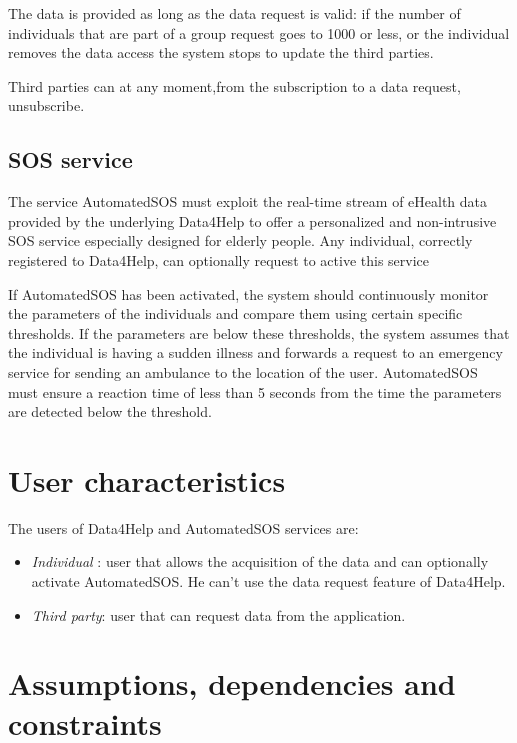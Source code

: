 The data is provided as long as the data request is valid: if the number of individuals that are part of a group request goes to 1000 or less, or the individual removes the data access the system stops to update the third parties. 

Third parties can at any moment,from the subscription to a data request, unsubscribe.





\subsection{SOS service}
The service AutomatedSOS must exploit the real-time stream of eHealth data provided by the underlying Data4Help to offer a personalized and non-intrusive SOS service especially designed for elderly people.
Any individual, correctly registered to Data4Help, can optionally request to active this service


If AutomatedSOS has been activated, the system should continuously monitor the parameters of the individuals and compare them using certain specific thresholds.
If the parameters are below these thresholds, the system assumes that the individual is having a sudden illness and forwards a request to an emergency service for sending an ambulance to the location of the user.
AutomatedSOS must ensure a reaction time of less than 5 seconds from the time the parameters are detected below the threshold.










\section{User characteristics}
The users of Data4Help and AutomatedSOS services are:

\begin{itemize}
\item \textit{Individual} : user that allows the acquisition of the data and can optionally activate AutomatedSOS. He can't use the data request feature of Data4Help.
\item \textit{Third party}: user that can request data from the application.
\end{itemize}





\section{Assumptions, dependencies and constraints}

